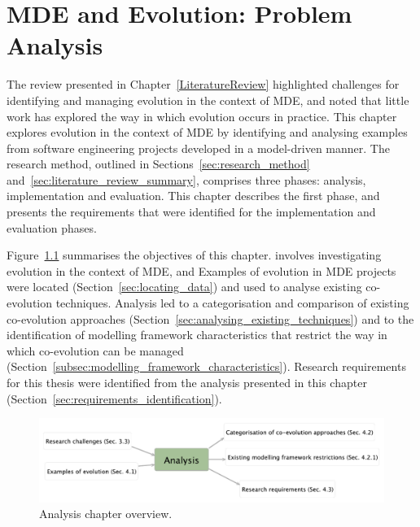 
\chapter{MDE and Evolution: Problem Analysis}
\label{Analysis}
The review presented in Chapter~\ref{LiteratureReview} highlighted challenges for identifying and managing evolution in the context of MDE, and noted that little work has explored the way in which evolution occurs in practice. This chapter explores evolution in the context of MDE by identifying and analysing examples from software engineering projects developed in a model-driven manner. The research method, outlined in Sections~\ref{sec:research_method} and~\ref{sec:literature_review_summary}, comprises three phases: analysis, implementation and evaluation. This chapter describes the first phase, and presents the requirements that were identified for the implementation and evaluation phases.

Figure~\ref{fig:analysis_overview} summarises the objectives of this chapter. involves investigating evolution in the context of MDE, and  Examples of evolution in MDE projects were located (Section~\ref{sec:locating_data}) and used to analyse existing co-evolution techniques. Analysis led to a categorisation and comparison of existing co-evolution approaches (Section~\ref{sec:analysing_existing_techniques}) and to the identification of modelling framework characteristics that restrict the way in which co-evolution can be managed (Section~\ref{subsec:modelling_framework_characteristics}). Research requirements for this thesis were identified from the analysis presented in this chapter (Section~\ref{sec:requirements_identification}).


\begin{figure}[htbp]
  \begin{center}
    \leavevmode
    \includegraphics[width=12cm]{4.Analysis/overview.pdf}
  \end{center}
  \caption{Analysis chapter overview.}
  \label{fig:analysis_overview}
\end{figure}

